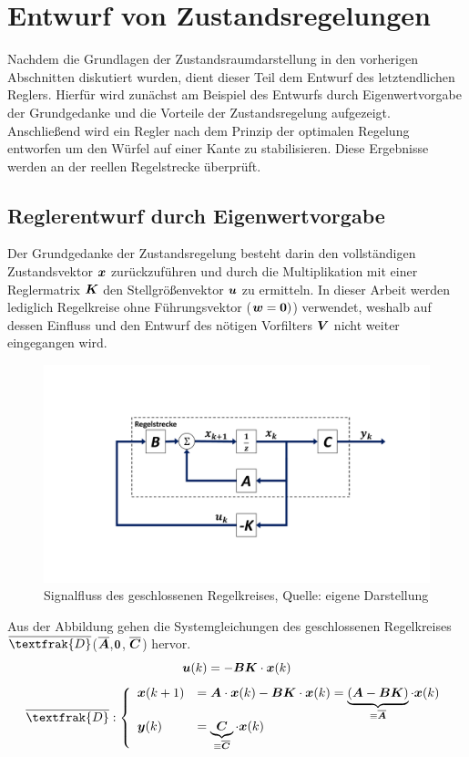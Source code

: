 \section{Entwurf von Zustandsregelungen}
Nachdem die Grundlagen der Zustandsraumdarstellung in den vorherigen Abschnitten diskutiert wurden, dient dieser Teil dem Entwurf des letztendlichen Reglers. Hierfür wird zunächst am Beispiel des Entwurfs durch Eigenwertvorgabe der Grundgedanke und die Vorteile der Zustandsregelung aufgezeigt. Anschließend wird ein Regler nach dem Prinzip der optimalen Regelung entworfen um den Würfel auf einer Kante zu stabilisieren. Diese Ergebnisse werden an der reellen Regelstrecke überprüft.

\subsection{Reglerentwurf durch Eigenwertvorgabe}
Der Grundgedanke der Zustandsregelung besteht darin den vollständigen Zustandsvektor $\boldsymbol{x}$ zurückzuführen und durch die Multiplikation mit einer Reglermatrix $\boldsymbol{K}$ den Stellgrößenvektor $\boldsymbol{u}$ zu ermitteln. In dieser Arbeit werden lediglich Regelkreise ohne Führungsvektor ($\boldsymbol{w}=\boldsymbol{0})$) verwendet, weshalb auf dessen Einfluss und den Entwurf des nötigen Vorfilters $\boldsymbol{V}$ nicht weiter eingegangen wird.
\begin{figure}[H]
\centering
\includegraphics[width=0.8\linewidth, trim={3.5cm 3.5cm 3.5cm 3.5cm}, clip]{img/RT_ClosedLoop}
\caption{Signalfluss des geschlossenen Regelkreises, Quelle: eigene Darstellung}
\end{figure}
Aus der Abbildung gehen die Systemgleichungen des geschlossenen Regelkreises $\overline{\textfrak{D}}$($\overline{\boldsymbol{A}}$,$\boldsymbol{0}$, $\overline{\boldsymbol{C}}$) hervor.
\begin{equation}
\boldsymbol{u}(k) = -\boldsymbol{B}\boldsymbol{K}\cdot\boldsymbol{x}(k)
\end{equation}
\begin{equation}
\overline{\textfrak{D}}
: \left\{ \begin{array}{ll}
\bs{{x}}(k+1) &= \bs{A}\cdot \bs{x}(k) - \bs{B}\bs{K}\cdot \bs{x}(k) = \underbrace{(\bs{A}-\bs{B}\bs{K})}_{\equiv \bs{\overline{A}}}\cdot \bs{x}(k) \\
\bs{y}(k) &= \underbrace{\bs{C}}_{\equiv \bs{\overline{C}}}\cdot \bs{x}(k)
\end{array}
\right.
\end{equation}
